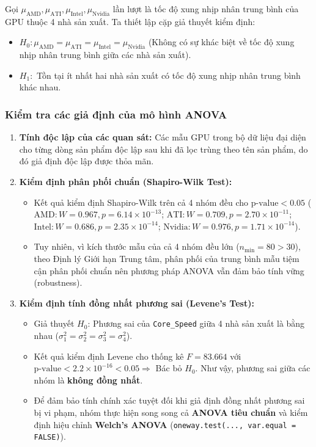         Gọi $\mu_{\text{AMD}}, \mu_{\text{ATI}}, \mu_{\text{Intel}}, \mu_{\text{Nvidia}}$ lần lượt là tốc độ xung nhịp nhân trung bình của GPU thuộc 4 nhà sản xuất. Ta thiết lập cặp giả thuyết kiểm định:
        \begin{itemize}
            \item $H_0: \mu_{\text{AMD}} = \mu_{\text{ATI}} = \mu_{\text{Intel}} = \mu_{\text{Nvidia}}$ (Không có sự khác biệt về tốc độ xung nhịp nhân trung bình giữa các nhà sản xuất).
            \item $H_1:$ Tồn tại ít nhất hai nhà sản xuất có tốc độ xung nhịp nhân trung bình khác nhau.
        \end{itemize}

    \subsubsection{Kiểm tra các giả định của mô hình ANOVA}
        \begin{enumerate}
            \item \textbf{Tính độc lập của các quan sát:} Các mẫu GPU trong bộ dữ liệu đại diện cho từng dòng sản phẩm độc lập sau khi đã lọc trùng theo tên sản phẩm, do đó giả định độc lập được thỏa mãn.
            \item \textbf{Kiểm định phân phối chuẩn (Shapiro-Wilk Test):}
            \begin{itemize}
                \item Kết quả kiểm định Shapiro-Wilk trên cả 4 nhóm đều cho $\text{p-value} < 0.05$ ($\text{AMD}: W = 0.967, p = 6.14 \times 10^{-13}$; $\text{ATI}: W = 0.709, p = 2.70 \times 10^{-11}$; $\text{Intel}: W = 0.686, p = 2.35 \times 10^{-14}$; $\text{Nvidia}: W = 0.976, p = 1.71 \times 10^{-14}$).
                \item Tuy nhiên, vì kích thước mẫu của cả 4 nhóm đều lớn ($n_{\min} = 80 > 30$), theo Định lý Giới hạn Trung tâm, phân phối của trung bình mẫu tiệm cận phân phối chuẩn nên phương pháp ANOVA vẫn đảm bảo tính vững (robustness).
            \end{itemize}
            \item \textbf{Kiểm định tính đồng nhất phương sai (Levene's Test):}
            \begin{itemize}
                \item Giả thuyết $H_0$: Phương sai của \texttt{Core\_Speed} giữa 4 nhà sản xuất là bằng nhau ($\sigma_1^2 = \sigma_2^2 = \sigma_3^2 = \sigma_4^2$).
                \item Kết quả kiểm định Levene cho thống kê $F = 83.664$ với $\text{p-value} < 2.2 \times 10^{-16} < 0.05 \Rightarrow$ Bác bỏ $H_0$. Như vậy, phương sai giữa các nhóm là \textbf{không đồng nhất}.
                \item Để đảm bảo tính chính xác tuyệt đối khi giả định đồng nhất phương sai bị vi phạm, nhóm thực hiện song song cả \textbf{ANOVA tiêu chuẩn} và kiểm định hiệu chỉnh \textbf{Welch's ANOVA} (\texttt{oneway.test(..., var.equal = FALSE)}).
            \end{itemize}
        \end{enumerate}
